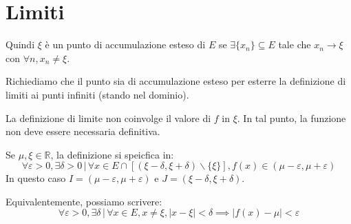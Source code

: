 \documentclass[a4paper]{article}
\begin{document}

\pagebreak

\section{Limiti}


Quindi \(\xi\) è un punto di accumulazione esteso di \(E\)
se \(\exists \{x_n\} \subseteq E\) tale che \(x_n \to \xi\) con  \(\forall n, x_n \neq \xi\).



Richiediamo che il punto sia di accumulazione esteso
per esterre la definizione di limiti ai punti infiniti (stando nel dominio).

La definizione di limite non coinvolge il valore di \(f\) in \(\xi\).
In tal punto, la funzione non deve essere necessaria definitiva.

Se \(\mu, \xi \in \mathbb{R}\), la definizione si speicfica in:
\[
    \forall \varepsilon > 0,
    \exists \delta > 0 \,|\,
    \forall x \in E \cap \left[(\xi - \delta, \xi + \delta) \backslash \{\xi\}\right],
    f(x) \in (\mu - \varepsilon, \mu + \varepsilon)
\]
In questo caso \(I=(\mu - \varepsilon, \mu + \varepsilon)\)
e \(J=(\xi - \delta, \xi + \delta)\).

Equivalentemente, possiamo scrivere:
\[\forall \varepsilon > 0, \exists \delta \,|\, \forall x \in E, x \neq \xi, |x-\xi|<\delta \implies |f(x) - \mu| < \varepsilon\]
\end{document}
